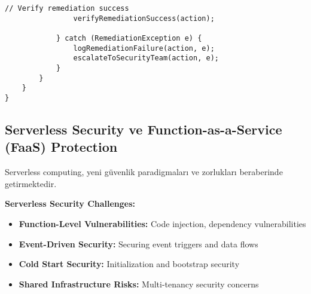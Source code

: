 \begin{lstlisting}[breaklines=true,basicstyle=\ttfamily\footnotesize]
                // Verify remediation success
                verifyRemediationSuccess(action);
                
            } catch (RemediationException e) {
                logRemediationFailure(action, e);
                escalateToSecurityTeam(action, e);
            }
        }
    }
}
\end{lstlisting}

\subsection{Serverless Security ve Function-as-a-Service (FaaS) Protection}

Serverless computing, yeni güvenlik paradigmaları ve zorlukları beraberinde getirmektedir.

\textbf{Serverless Security Challenges:}
\begin{itemize}
    \item \textbf{Function-Level Vulnerabilities:} Code injection, dependency vulnerabilities
    \item \textbf{Event-Driven Security:} Securing event triggers and data flows
    \item \textbf{Cold Start Security:} Initialization and bootstrap security
    \item \textbf{Shared Infrastructure Risks:} Multi-tenancy security concerns
\end{itemize}

